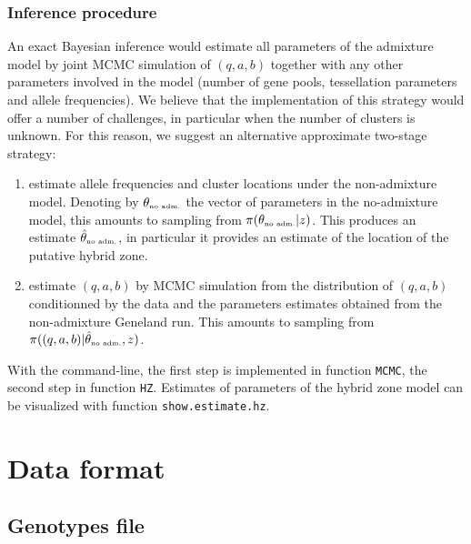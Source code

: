 \documentclass[a4paper,10pt]{article}
\begin{document}
\subsubsection{Inference  procedure}
An exact Bayesian inference would estimate all parameters of the admixture model 
by joint MCMC simulation of $(q,a,b)$ together with any other parameters involved in the model 
(number of gene pools, tessellation parameters and allele frequencies). 
We believe that the implementation of this strategy would offer a number of challenges, in particular when the number of clusters is unknown. 
For this reason, we suggest an alternative approximate two-stage strategy:

\begin{enumerate}
\item estimate allele frequencies and cluster locations under the non-admixture model. Denoting by $\theta_{\mbox{\tiny no adm.}}$ the vector of 
parameters in the no-admixture model, this amounts to sampling from $\pi(\theta_{\mbox{\tiny no adm.}} |z)$. This produces 
an estimate $\hat{\theta}_{\mbox{\tiny no adm.}}$, in particular it provides an estimate of the location of the putative hybrid zone. 
\item estimate  $(q,a,b)$ by MCMC simulation from the distribution of  $(q,a,b)$ conditionned by the data and the parameters estimates obtained from the non-admixture Geneland run. This amounts to sampling from  $\pi( (q,a,b) | \hat{\theta}_{\mbox{\tiny no adm.}} , z)$.
\end{enumerate}

With the command-line, the first step is implemented in function {\tt MCMC}, the second step in function {\tt HZ}.
Estimates of parameters of the hybrid zone model can be visualized with function {\tt show.estimate.hz}.
\clearpage
\section{Data format}\label{sec:data_format}

\subsection{Genotypes file}
\end{document}
